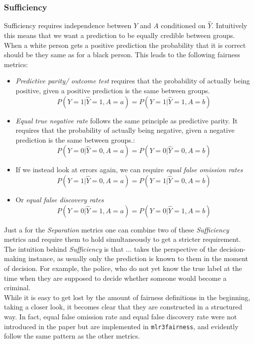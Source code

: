 \subsubsection*{Sufficiency}
Sufficiency requires independence between $Y$ and $A$ conditioned on $\hat{Y}$. Intuitively this means that we want a prediction to be equally credible between groups. When a white person gets a positive prediction the probability that it is correct should be they same as for a black person. This leads to the following fairness metrics:
\begin{itemize}
    \item \textit{Predictive parity/ outcome test} requires that the probability of actually being positive, given a positive prediction is the same between groups. $$P(Y = 1 | \hat{Y} = 1, A = a) = P(Y = 1 | \hat{Y} = 1, A = b)$$
    \item \textit{Equal true negative rate} follows the same principle as predictive parity. It requires that the probability of actually being negative, given a negative prediction is the same between groups.: $$P(Y = 0 | \hat{Y} = 0, A = a) = P(Y = 0 | \hat{Y} = 0, A = b)$$
    \item If we instead look at errors again, we can require \textit{equal false omission rates} $$P(Y = 1 | \hat{Y} = 0, A = a) = P(Y = 1 | \hat{Y} = 0, A = b)$$
    \item Or \textit{equal false discovery rates} $$P(Y = 0 | \hat{Y} = 1, A = a) = P(Y = 0 | \hat{Y} = 1, A = b)$$
\end{itemize}

Just a for the \textit{Separation} metrics one can combine two of these \textit{Sufficiency} metrics and require them to hold simultaneously to get a stricter requirement.
The intuition behind \textit{Sufficiency} is that ... takes the perspective of the decision-making instance, as usually only the prediction is known to them in the moment of decision. For example, the police, who do not yet know the true label at the time when they are supposed to decide whether someone would become a criminal.\\
While it is easy to get lost by the amount of fairness definitions in the beginning, taking a closer look, it becomes clear that they are constructed in a structured way. In fact, equal false omission rate and equal false discovery rate were not introduced in the paper \cite{verma2018} but are implemented in \texttt{mlr3fairness}, and evidently follow the same pattern as the other metrics.


